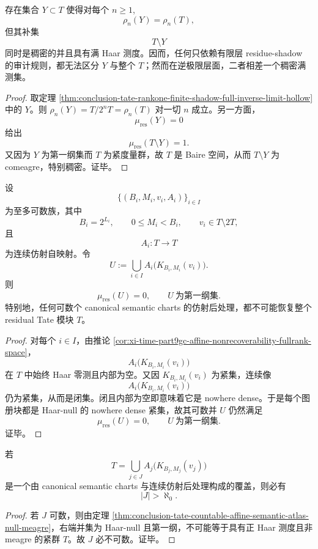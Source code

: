 \begin{corollary}\label{cor:conclusion-tate-finite-shadow-complete-not-residual-complete}
存在集合 \(Y\subset T\) 使得对每个 \(n\ge 1\),
\[
\rho_n(Y)=\rho_n(T),
\]
但其补集
\[
T\setminus Y
\]
同时是稠密的并且具有满 Haar 测度。因而，任何只依赖有限层 residue-shadow 的审计规则，都无法区分 \(Y\) 与整个 \(T\)；然而在逆极限层面，二者相差一个稠密满测集。
\end{corollary}
\begin{proof}
取定理 \ref{thm:conclusion-tate-rankone-finite-shadow-full-inverse-limit-hollow} 中的 \(Y\)。则 \(\rho_n(Y)=T/2^nT=\rho_n(T)\) 对一切 \(n\) 成立。另一方面，
\[
\mu_{\mathrm{res}}(Y)=0
\]
给出
\[
\mu_{\mathrm{res}}(T\setminus Y)=1.
\]
又因为 \(Y\) 为第一纲集而 \(T\) 为紧度量群，故 \(T\) 是 Baire 空间，从而 \(T\setminus Y\) 为 comeagre，特别稠密。证毕。
\end{proof}

\begin{theorem}\label{thm:conclusion-tate-countable-affine-semantic-atlas-null-meagre}
设
\[
\{(B_i,M_i,v_i,A_i)\}_{i\in I}
\]
为至多可数族，其中
\[
B_i=2^{L_i},
\qquad
0\le M_i<B_i,
\qquad
v_i\in T\setminus 2T,
\]
且
\[
A_i:T\to T
\]
为连续仿射自映射。令
\[
U:=
\bigcup_{i\in I}A_i\bigl(K_{B_i,M_i}(v_i)\bigr).
\]
则
\[
\mu_{\mathrm{res}}(U)=0,
\qquad
U\ \text{为第一纲集}.
\]
特别地，任何可数个 canonical semantic charts 的仿射后处理，都不可能恢复整个 residual Tate 模块 \(T\)。
\end{theorem}
\begin{proof}
对每个 \(i\in I\)，由推论 \ref{cor:xi-time-part9gc-affine-nonrecoverability-fullrank-space}，
\[
A_i\bigl(K_{B_i,M_i}(v_i)\bigr)
\]
在 \(T\) 中始终 Haar 零测且内部为空。又因 \(K_{B_i,M_i}(v_i)\) 为紧集，连续像
\[
A_i\bigl(K_{B_i,M_i}(v_i)\bigr)
\]
仍为紧集，从而是闭集。闭且内部为空即意味着它是 nowhere dense。于是每个图册块都是 Haar-null 的 nowhere dense 紧集，故其可数并 \(U\) 仍然满足
\[
\mu_{\mathrm{res}}(U)=0,
\qquad
U\ \text{为第一纲集}.
\]
证毕。
\end{proof}

\begin{corollary}\label{cor:conclusion-tate-semantic-atlas-uncountable-threshold}
若
\[
T=\bigcup_{j\in J}A_j\bigl(K_{B_j,M_j}(v_j)\bigr)
\]
是一个由 canonical semantic charts 与连续仿射后处理构成的覆盖，则必有
\[
|J|>\aleph_0.
\]
\end{corollary}
\begin{proof}
若 \(J\) 可数，则由定理 \ref{thm:conclusion-tate-countable-affine-semantic-atlas-null-meagre}，右端并集为 Haar-null 且第一纲，不可能等于具有正 Haar 测度且非 meagre 的紧群 \(T\)。故 \(J\) 必不可数。证毕。
\end{proof}


